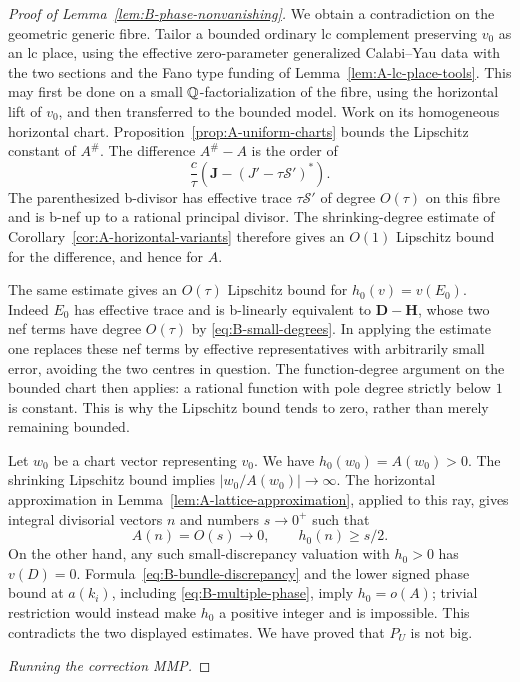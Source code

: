 \begin{proof}[Proof of Lemma~\ref{lem:B-phase-nonvanishing}]
We obtain a contradiction on the geometric generic fibre.
Tailor a bounded ordinary lc complement preserving $v_0$ as
an lc place, using the effective zero-parameter generalized
Calabi--Yau data with the two sections and the Fano type
funding of Lemma~\ref{lem:A-lc-place-tools}.  This may first
be done on a small $\mathbb Q$-factorialization of the fibre, using
the horizontal lift of $v_0$, and then transferred to the
bounded model.  Work on its homogeneous horizontal chart.
Proposition~\ref{prop:A-uniform-charts} bounds the Lipschitz
constant of $A^\#$.  The difference $A^\#-A$ is the order of
\[
 \frac c\tau\left(\mathbf J-(J'-\tau\mathcal S')^*\right).
\]
The parenthesized b-divisor has effective trace
$\tau\mathcal S'$ of degree $O(\tau)$ on this fibre and is
b-nef up to a rational principal divisor.  The shrinking-degree
estimate of Corollary~\ref{cor:A-horizontal-variants} therefore
gives an $O(1)$ Lipschitz bound for the difference, and hence
for $A$.

The same estimate gives an $O(\tau)$ Lipschitz bound for
$h_0(v)=v(E_0)$.  Indeed $E_0$ has effective trace and is
b-linearly equivalent to $\mathbf D-\mathbf H$, whose two nef
terms have degree $O(\tau)$ by \eqref{eq:B-small-degrees}.
In applying the estimate one replaces these nef terms by
effective representatives with arbitrarily small error,
avoiding the two centres in question.  The function-degree
argument on the bounded chart then applies: a rational
function with pole degree strictly below $1$ is constant.
This is why the Lipschitz bound tends to zero, rather than
merely remaining bounded.

Let $w_0$ be a chart vector representing $v_0$.  We have
$h_0(w_0)=A(w_0)>0$.  The shrinking Lipschitz bound implies
$|w_0/A(w_0)|\to\infty$.  The horizontal approximation in
Lemma~\ref{lem:A-lattice-approximation}, applied to this ray,
gives integral divisorial vectors $n$ and numbers $s\to0^+$
such that
\[
 A(n)=O(s)\longrightarrow0,
 \qquad h_0(n)\ge s/2.
\]
On the other hand, any such small-discrepancy valuation with
$h_0>0$ has $v(D)=0$.  Formula~\eqref{eq:B-bundle-discrepancy}
and the lower signed phase bound at $a(k_i)$, including
\eqref{eq:B-multiple-phase}, imply $h_0=o(A)$; trivial
restriction would instead make $h_0$ a positive integer and
is impossible.  This contradicts the two displayed estimates.
We have proved that $P_U$ is not big.

\medskip
\noindent\emph{Running the correction MMP.}


\end{proof}
